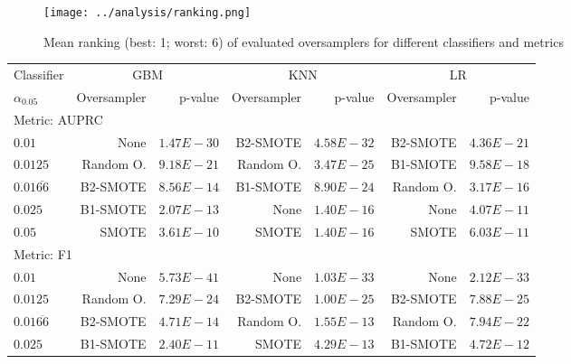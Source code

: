 \documentclass[sort&compress]{elsarticle}
\begin{document}
\begin{figure}[!htb]
\centering
\texttt{[image: ../analysis/ranking.png]}
\caption[Mean ranking of evaluated oversamplers for different classifiers and metrics]
{Mean ranking (best: 1; worst: 6) of evaluated oversamplers for different classifiers and metrics}
\label{fig:ranking}
\end{figure}

\begin{table}[!htb]
	\centering
	\begin{tabular}{lrrrrrr}
	\toprule
	\multicolumn{1}{c}{Classifier} &
	\multicolumn{2}{c}{GBM} &
	\multicolumn{2}{c}{KNN} &
	\multicolumn{2}{c}{LR}\\
	\cmidrule(lr){2-3}
	\cmidrule(lr){4-5}
	\cmidrule(lr){5-7}
	$\alpha _{0.05}$				&       Oversampler & p-value &       Oversampler & p-value &       Oversampler & p-value \\
	\midrule
	\multicolumn{2}{l}{Metric: AUPRC} & & & & & \\
	$0.01$        		& None              & $1.47E-30$ & B2-SMOTE          & $4.58E-32$ & B2-SMOTE          & $4.36E-21$ \\
	$0.0125$      		& Random O. & $9.18E-21$ & Random O. & $3.47E-25$ & B1-SMOTE          & $9.58E-18$ \\
	$0.01\overline{66}$ 	& B2-SMOTE          & $8.56E-14$ & B1-SMOTE          & $8.90E-24$ & Random O. & $3.17E-16$ \\
	$0.025$       		& B1-SMOTE          & $2.07E-13$ & None              & $1.40E-16$ & None              & $4.07E-11$ \\
	$0.05$        		& SMOTE             & $3.61E-10$ & SMOTE             & $1.40E-16$ & SMOTE             & $6.03E-11$ \\
	\multicolumn{2}{l}{Metric: F1} & & & & & \\
	$0.01$        		& None              & $5.73E-41$ & None              & $1.03E-33$ & None              & $2.12E-33$ \\
	$0.0125$      		& Random O. & $7.29E-24$ & B2-SMOTE          & $1.00E-25$ & B2-SMOTE          & $7.88E-25$ \\
	$0.01\overline{66}$ 	& B2-SMOTE          & $4.71E-14$ & Random O. & $1.55E-13$ & Random O. & $7.94E-22$ \\
	$0.025$       		& B1-SMOTE          & $2.40E-11$ & SMOTE             & $4.29E-13$ & B1-SMOTE          & $4.72E-12$ \\

\end{tabular}
\end{table}
\end{document}
